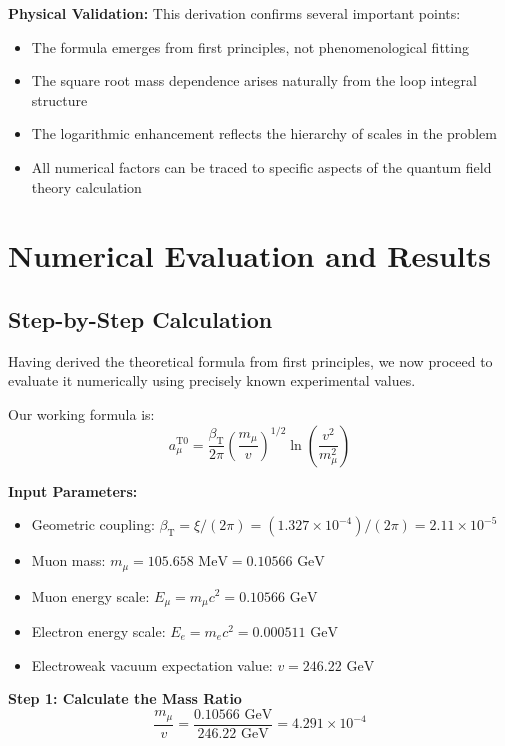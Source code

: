 \documentclass[12pt,a4paper]{article}
\newcommand{\betaT}{\beta_{\text{T}}}
\newcommand{\xigeom}{\xi}
\newcommand{\Ee}{E_e}
\newcommand{\Emu}{E_{\mu}}
\begin{document}
	\textbf{Physical Validation:} This derivation confirms several important points:
	\begin{itemize}
		\item The formula emerges from first principles, not phenomenological fitting
		\item The square root mass dependence arises naturally from the loop integral structure
		\item The logarithmic enhancement reflects the hierarchy of scales in the problem
		\item All numerical factors can be traced to specific aspects of the quantum field theory calculation
	\end{itemize}
	
	\section{Numerical Evaluation and Results}
	
	\subsection{Step-by-Step Calculation}
	
	Having derived the theoretical formula from first principles, we now proceed to evaluate it numerically using precisely known experimental values.
	
	Our working formula is:
	\begin{equation}
		a_\mu^{\text{T0}} = \frac{\betaT}{2\pi} \left(\frac{m_\mu}{v}\right)^{1/2} \ln\left(\frac{v^2}{m_\mu^2}\right)
	\end{equation}
	
	\textbf{Input Parameters:}
	\begin{itemize}
		\item Geometric coupling: $\betaT = \xigeom/(2\pi) = (1.327 \times 10^{-4})/(2\pi) = 2.11 \times 10^{-5}$
		\item Muon mass: $m_\mu = 105.658 \text{ MeV} = 0.10566 \text{ GeV}$
		\item Muon energy scale: $\Emu = m_\mu c^2 = 0.10566 \text{ GeV}$
		\item Electron energy scale: $\Ee = m_e c^2 = 0.000511 \text{ GeV}$
		\item Electroweak vacuum expectation value: $v = 246.22 \text{ GeV}$
	\end{itemize}
	
	\textbf{Step 1: Calculate the Mass Ratio}
	\begin{equation}
		\frac{m_\mu}{v} = \frac{0.10566 \text{ GeV}}{246.22 \text{ GeV}} = 4.291 \times 10^{-4}
	\end{equation}
	
\end{document}
